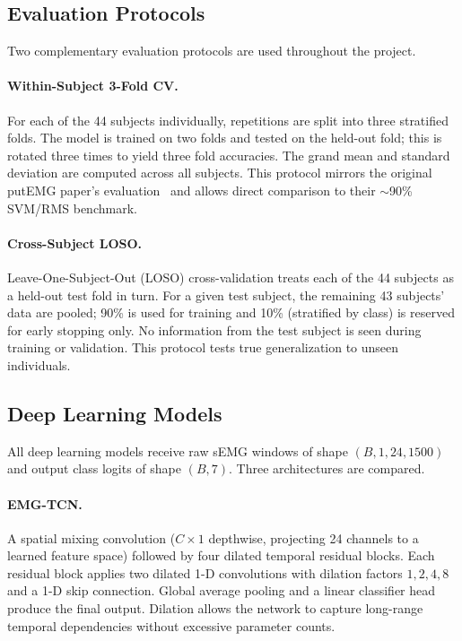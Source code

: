 \documentclass[11pt,twocolumn]{article}
\begin{document}
\subsection{Evaluation Protocols}

Two complementary evaluation protocols are used throughout the project.

\paragraph{Within-Subject 3-Fold CV.}
For each of the 44 subjects individually, repetitions are split into three
stratified folds. The model is trained on two folds and tested on the held-out
fold; this is rotated three times to yield three fold accuracies. The grand mean
and standard deviation are computed across all subjects. This protocol mirrors the
original putEMG paper's evaluation~\cite{kaczmarek2019putemg} and allows direct
comparison to their $\sim$90\% SVM/RMS benchmark.

\paragraph{Cross-Subject LOSO.}
Leave-One-Subject-Out (LOSO) cross-validation treats each of the 44 subjects as
a held-out test fold in turn. For a given test subject, the remaining 43 subjects'
data are pooled; 90\% is used for training and 10\% (stratified by class) is
reserved for early stopping only. No information from the test subject is seen
during training or validation. This protocol tests true generalization to unseen
individuals.

\subsection{Deep Learning Models}
\label{sec:dl}

All deep learning models receive raw sEMG windows of shape
$(B, 1, 24, 1500)$ and output class logits of shape $(B, 7)$. Three architectures
are compared.

\paragraph{EMG-TCN.}
A spatial mixing convolution ($C \times 1$ depthwise, projecting 24 channels to a
learned feature space) followed by four dilated temporal residual blocks. Each
residual block applies two dilated 1-D convolutions with dilation factors
$1, 2, 4, 8$ and a 1-D skip connection. Global average pooling and a linear
classifier head produce the final output. Dilation allows the network to capture
long-range temporal dependencies without excessive parameter counts.
\end{document}
